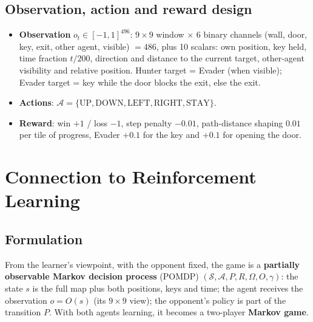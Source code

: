 \documentclass[11pt,a4paper]{article}
\begin{document}
\subsection{Observation, action and reward design}
\begin{itemize}
  \item \textbf{Observation} $o_t\in[-1,1]^{496}$: $9\times9$ window $\times$ 6 binary channels
        (wall, door, key, exit, other agent, visible) $=486$, plus 10 scalars: own position, key
        held, time fraction $t/200$, direction and distance to the current target, other-agent
        visibility and relative position. Hunter target = Evader (when visible); Evader target =
        key while the door blocks the exit, else the exit.
  \item \textbf{Actions}: $\mathcal{A}=\{\text{UP},\text{DOWN},\text{LEFT},\text{RIGHT},\text{STAY}\}$.
  \item \textbf{Reward}: win $+1$ / loss $-1$, step penalty $-0.01$, path-distance shaping $0.01$ per
        tile of progress, Evader $+0.1$ for the key and $+0.1$ for opening the door.
\end{itemize}

\section{Connection to Reinforcement Learning}

\subsection{Formulation}
From the learner's viewpoint, with the opponent fixed, the game is a \textbf{partially observable
Markov decision process} (POMDP) $(\mathcal{S},\mathcal{A},P,R,\Omega,O,\gamma)$:
the state $s$ is the full map plus both positions, keys and time; the agent receives the
observation $o=O(s)$ (its $9\times9$ view); the opponent's policy is part of the transition $P$.
With both agents learning, it becomes a two-player \textbf{Markov game}.
\end{document}
